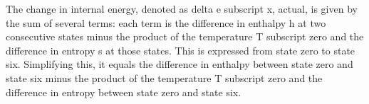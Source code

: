 The change in internal energy, denoted as delta e subscript x, actual, is given by the sum of several terms: each term is the difference in enthalpy h at two consecutive states minus the product of the temperature T subscript zero and the difference in entropy s at those states. This is expressed from state zero to state six. Simplifying this, it equals the difference in enthalpy between state zero and state six minus the product of the temperature T subscript zero and the difference in entropy between state zero and state six.